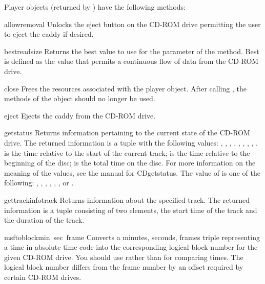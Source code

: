 Player objects (returned by ) have the following
methods:

\renewcommand{\indexsubitem}{(CD player object method)}

\begin{funcdesc}{allowremoval}{}
Unlocks the eject button on the CD-ROM drive permitting the user to
eject the caddy if desired.
\end{funcdesc}

\begin{funcdesc}{bestreadsize}{}
Returns the best value to use for the  parameter of
the  method.  Best is defined as the value that permits a
continuous flow of data from the CD-ROM drive.
\end{funcdesc}

\begin{funcdesc}{close}{}
Frees the resources associated with the player object.  After calling
, the methods of the object should no longer be used.
\end{funcdesc}

\begin{funcdesc}{eject}{}
Ejects the caddy from the CD-ROM drive.
\end{funcdesc}

\begin{funcdesc}{getstatus}{}
Returns information pertaining to the current state of the CD-ROM
drive.  The returned information is a tuple with the following values:
, , , , ,
, , , .
 is the time relative to the start of the current track;
 is the time relative to the beginning of the disc;
 is the total time on the disc.  For more information on
the meaning of the values, see the manual for CDgetstatus.
The value of  is one of the following: ,
, , ,
, , or .
\end{funcdesc}

\begin{funcdesc}{gettrackinfo}{track}
Returns information about the specified track.  The returned
information is a tuple consisting of two elements, the start time of
the track and the duration of the track.
\end{funcdesc}

\begin{funcdesc}{msftoblock}{min\, sec\, frame}
Converts a minutes, seconds, frames triple representing a time in
absolute time code into the corresponding logical block number for the
given CD-ROM drive.  You should use  rather than
 for comparing times.  The logical block number
differs from the frame number by an offset required by certain CD-ROM
drives.
\end{funcdesc}

